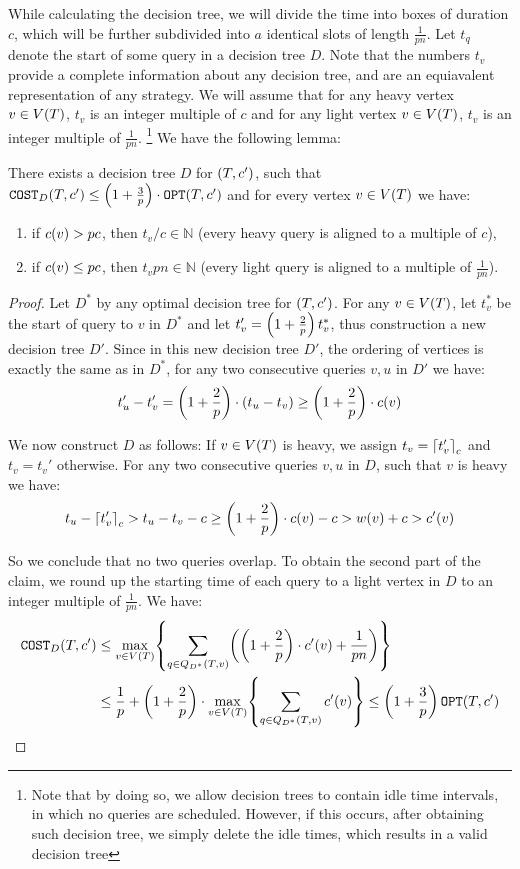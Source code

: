 While calculating the decision tree, we will divide the time into boxes of duration $c$, which will be further subdivided into $a$ identical slots of length $\frac{1}{pn}$. Let $t_q$ denote the start of some query in a decision tree $D$. Note that the numbers $t_v$ provide a complete information about any decision tree, and are an equiavalent representation of any strategy. We will assume that for any heavy vertex $v\in V\mathopen{}\left( T \right)$, $t_v$ is an integer multiple of $c$ and for any light vertex $v\in V\mathopen{}\left( T \right)$, $t_v$ is an integer multiple of $\frac{1}{pn}$. \footnote{Note that by doing so, we allow decision trees to contain idle time intervals, in which no queries are scheduled. However, if this occurs, after obtaining such decision tree, we simply delete the idle times, which results in a valid decision tree} We have the following lemma:
\begin{lemma}\label{aligned_dts_lemma}
    There exists a decision tree $D$ for $\mathopen{}\left( T,c' \right)$, such that $\texttt{COST}_{D}\mathopen{}\left( T, c' \right)\leq \mathopen{}\left( 1+\frac{3}{p} \right)\cdot\texttt{OPT}\mathopen{}\left( T, c' \right)$ and for every vertex $v\in V\mathopen{}\left( T \right)$ we have:
    \begin{enumerate}
        \item if $c\mathopen{}\left( v \right)> pc$, then $t_v/c\in\mathbb{N}$ (every heavy query is aligned to a multiple of $c$),
        \item if $c\mathopen{}\left( v \right)\leq pc$, then $t_vpn\in\mathbb{N}$ (every light query is aligned to a multiple of $\frac{1}{pn}$).
    \end{enumerate}
    \begin{proof}
        Let $D^*$ by any optimal decision tree for $\mathopen{}\left( T,c' \right)$. For any $v\in V\mathopen{}\left( T \right)$, let $t_v^*$ be the start of query to $v$ in $D^*$ and let $t_v'=\mathopen{}\left( 1+\frac{2}{p} \right)t_v^*$, thus construction a new decision tree $D'$. Since in this new decision tree $D'$, the ordering of vertices is exactly the same as in $D^*$, for any two consecutive queries $v,u$ in $D'$ we have:
        $$
            t_u'-t_v'=\mathopen{}\left( 1+\frac{2}{p} \right)\cdot\mathopen{}\left( t_u-t_v \right)\geq \mathopen{}\left( 1+\frac{2}{p} \right)\cdot c\mathopen{}\left( v \right)
        $$

        We now construct $D$ as follows: If $v\in V\mathopen{}\left( T \right)$ is heavy, we assign $t_v=\mathopen{}\left\lceil t_v' \right\rceil_c$ and $t_v=t_v'$ otherwise. For any two consecutive queries $v,u$ in $D$, such that $v$ is heavy we have:
        $$
        t_u-\mathopen{}\left\lceil t_v' \right\rceil_c>t_u-t_v-c\geq \mathopen{}\left( 1+\frac{2}{p} \right)\cdot c\mathopen{}\left( v \right)-c>w\mathopen{}\left( v \right)+c>c'\mathopen{}\left( v \right)
        $$

        So we conclude that no two queries overlap. To obtain the second part of the claim, we round up the starting time of each query to a light vertex in $D$ to an integer multiple of $\frac{1}{pn}$. We have:
        \begin{align*}
            \texttt{COST}_{D}\mathopen{}\left( T,c' \right)&
            \leq \max_{v\in V\mathopen{}\left( T \right)}\mathopen{}\left\{ \sum_{q\in Q_{D^*}\mathopen{}\left( T,v \right)}\mathopen{}\left( \mathopen{}\left( 1+\frac{2}{p} \right)\cdot c'\mathopen{}\left( v \right)+\frac{1}{pn} \right) \right\}
            \\&
            \leq \frac{1}{p}+\mathopen{}\left( 1+\frac{2}{p} \right)\cdot \max_{v\in V\mathopen{}\left( T \right)}\mathopen{}\left\{ \sum_{q\in Q_{D^*}\mathopen{}\left( T,v \right)}c'\mathopen{}\left( v \right)  \right\}\leq \mathopen{}\left( 1+\frac{3}{p} \right)\texttt{OPT}\mathopen{}\left( T,c' \right)
        \end{align*}


\end{proof}
\end{lemma}
